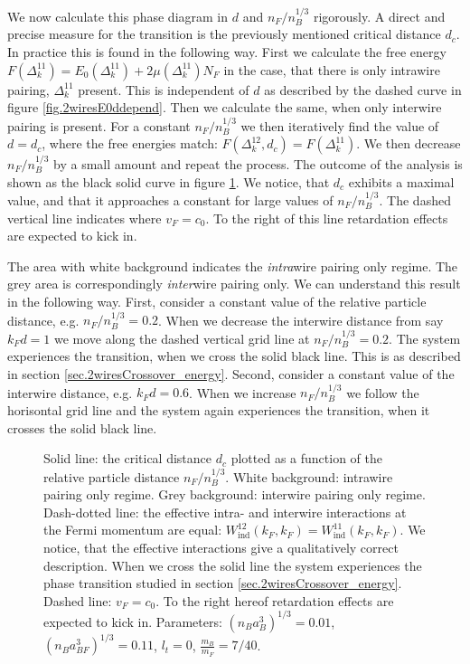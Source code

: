 We now calculate this phase diagram in $d$ and $n_F/n_B^{1/3}$ rigorously. A direct and precise measure for the transition is the previously mentioned critical distance $d_c$. In practice this is found in the following way. First we calculate the free energy $F(\Delta^{11}_k) = E_0(\Delta^{11}_k) + 2 \mu (\Delta^{11}_k) N_F$ in the case, that there is only intrawire pairing, $\Delta^{11}_k$ present. This is independent of $d$ as described by the dashed curve in figure \ref{fig.2wiresE0ddepend}. Then we calculate the same, when only interwire pairing is present. For a constant $n_F/n_B^{1/3}$ we then iteratively find the value of $d = d_c$, where the free energies match: $F(\Delta^{12}_k, d_c) = F(\Delta^{11}_k)$. We then decrease $n_F/n_B^{1/3}$ by a small amount and repeat the process. The outcome of the analysis is shown as the black solid curve in figure \ref{fig.twowirescrossovernBdepend}. We notice, that $d_c$ exhibits a maximal value, and that it approaches a constant for large values of $n_F/n_B^{1/3}$. The dashed vertical line indicates where $v_F = c_0$. To the right of this line retardation effects are expected to kick in. 

The area with white background indicates the \textit{intra}wire pairing only regime. The grey area is correspondingly \textit{inter}wire pairing only. We can understand this result in the following way. First, consider a constant value of the relative particle distance, e.g. $n_F/n_B^{1/3} = 0.2$. When we decrease the interwire distance from say $k_Fd = 1$ we move along the dashed vertical grid line at $n_F/n_B^{1/3} = 0.2$. The system experiences the transition, when we cross the solid black line. This is as described in section \ref{sec.2wiresCrossover_energy}. Second, consider a constant value of the interwire distance, e.g. $k_Fd = 0.6$. When we increase $n_F/n_B^{1/3}$ we follow the horisontal grid line and the system again experiences the transition, when it crosses the solid black line. 

\begin{figure} 
\begin{center}  
  
\caption{Solid line: the critical distance $d_c$ plotted as a function of the relative particle distance $n_F/n_B^{1/3}$. White background: intrawire pairing only regime. Grey background: interwire pairing only regime. Dash-dotted line: the effective intra- and interwire interactions at the Fermi momentum are equal: $W^{12}_{\text{ind}}(k_F, k_F) = W^{11}_{\text{ind}}(k_F, k_F)$. We notice, that the effective interactions give a qualitatively correct description. When we cross the solid line the system experiences the phase transition studied in section \ref{sec.2wiresCrossover_energy}. Dashed line: $v_F = c_0$. To the right hereof retardation effects are expected to kick in. Parameters: $(n_Ba_B^3)^{1/3} = 0.01$, $(n_Ba_{BF}^3)^{1/3} = 0.11$, $l_t = 0$, $\frac{m_B}{m_F} = 7/40$. }  
\label{fig.twowirescrossovernBdepend}  
\end{center}    
\end{figure}

